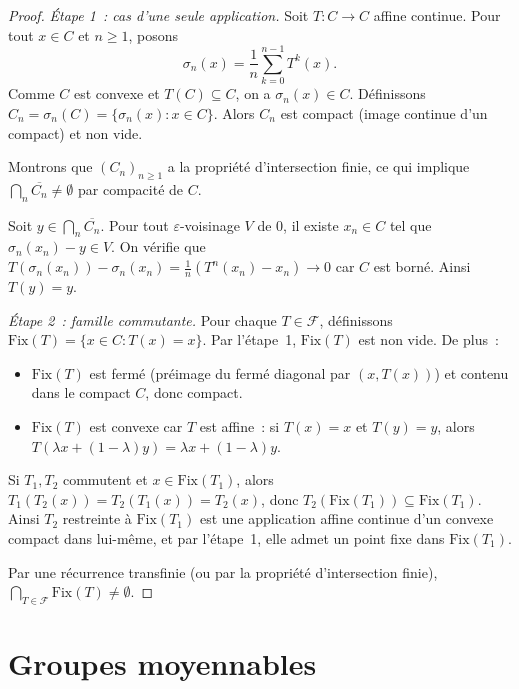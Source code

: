 \begin{proof}
\emph{\'Etape 1~: cas d'une seule application.}
Soit $T\colon C \to C$ affine continue. Pour tout $x \in C$ et $n \geq 1$, posons
\[
  \sigma_n(x) = \frac{1}{n} \sum_{k=0}^{n-1} T^k(x).
\]
Comme $C$ est convexe et $T(C) \subseteq C$, on a $\sigma_n(x) \in C$. D\'efinissons
$C_n = \sigma_n(C) = \{\sigma_n(x) : x \in C\}$. Alors $C_n$ est compact (image continue
d'un compact) et non vide.

Montrons que $(C_n)_{n \geq 1}$ a la propri\'et\'e d'intersection finie, ce qui implique
$\bigcap_n \overline{C_n} \neq \emptyset$ par compacit\'e de $C$.

Soit $y \in \bigcap_n \overline{C_n}$. Pour tout $\varepsilon$-voisinage $V$ de $0$, il
existe $x_n \in C$ tel que $\sigma_n(x_n) - y \in V$. On v\'erifie que
$T(\sigma_n(x_n)) - \sigma_n(x_n) = \frac{1}{n}(T^n(x_n) - x_n) \to 0$ car $C$ est
born\'e. Ainsi $T(y) = y$.

\emph{\'Etape 2~: famille commutante.}
Pour chaque $T \in \mathcal{F}$, d\'efinissons $\mathrm{Fix}(T) = \{x \in C : T(x) = x\}$.
Par l'\'etape~1, $\mathrm{Fix}(T)$ est non vide. De plus~:
\begin{itemize}
  \item $\mathrm{Fix}(T)$ est ferm\'e (pr\'eimage du ferm\'e diagonal par $(x, T(x))$)
    et contenu dans le compact $C$, donc compact.
  \item $\mathrm{Fix}(T)$ est convexe car $T$ est affine~: si $T(x) = x$ et $T(y) = y$,
    alors $T(\lambda x + (1-\lambda)y) = \lambda x + (1-\lambda)y$.
\end{itemize}
Si $T_1, T_2$ commutent et $x \in \mathrm{Fix}(T_1)$, alors
$T_1(T_2(x)) = T_2(T_1(x)) = T_2(x)$, donc $T_2(\mathrm{Fix}(T_1)) \subseteq \mathrm{Fix}(T_1)$.
Ainsi $T_2$ restreinte \`a $\mathrm{Fix}(T_1)$ est une application affine continue d'un
convexe compact dans lui-m\^eme, et par l'\'etape~1, elle admet un point fixe dans
$\mathrm{Fix}(T_1)$.

Par une r\'ecurrence transfinie (ou par la propri\'et\'e d'intersection finie),
$\bigcap_{T \in \mathcal{F}} \mathrm{Fix}(T) \neq \emptyset$.
\end{proof}

\section{Groupes moyennables}

